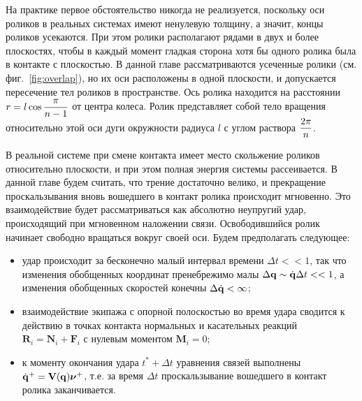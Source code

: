 
На практике первое обстоятельство никогда не реализуется, поскольку оси роликов в реальных системах имеют ненулевую толщину, а значит, концы роликов усекаются. При этом ролики располагают рядами в двух и более плоскостях, чтобы в каждый момент гладкая сторона хотя бы одного ролика была в контакте с плоскостью. В данной главе рассматриваются усеченные ролики (см. фиг.~\ref{fig:overlap}), но их оси расположены в одной плоскости, и допускается пересечение тел роликов в пространстве. Ось ролика находится на расстоянии $r = l\cos\displaystyle\frac{\displaystyle \pi}{\displaystyle n-1}$ от центра колеса. Ролик представляет собой тело вращения относительно этой оси дуги окружности радиуса $l$ с углом раствора $\displaystyle\frac{\displaystyle 2\pi}{\displaystyle n}$.


В реальной системе при смене контакта имеет место скольжение роликов относительно плоскости, и при этом полная энергия системы рассеивается. В данной главе будем считать, что трение достаточно велико, и прекращение проскальзывания вновь вошедшего в контакт ролика происходит мгновенно. Это взаимодействие будет рассматриваться как абсолютно неупругий удар, происходящий при мгновенном наложении связи.
Освободившийся ролик начинает свободно вращаться вокруг своей оси.
Будем предполагать следующее:
\begin{itemize}
    \item удар происходит за бесконечно малый интервал времени $\Delta t << 1$, так что изменения обобщенных координат пренебрежимо малы $\Delta \mathbf{q} \sim \dot{\mathbf{q}}\Delta t << 1$, а изменения обобщенных скоростей конечны $\Delta \dot{\mathbf{q}} < \infty$;
    \item взаимодействие экипажа с опорной полоскостью во время удара сводится к действию в точках контакта нормальных и касательных реакций $\mathbf{R}_i = \mathbf{N}_i + \mathbf{F}_i$ с нулевым моментом $\mathbf{M}_i = 0$;
    \item к моменту окончания удара $t^*+\Delta t$ уравнения связей выполнены $\dot{\mathbf{q}}^+ = \mathbf{V}(\mathbf{q})\boldsymbol{\mathbf{\nu}}^+$, т.е. за время $\Delta t$ проскальзывание вошедшего в контакт ролика заканчивается.
\end{itemize}

